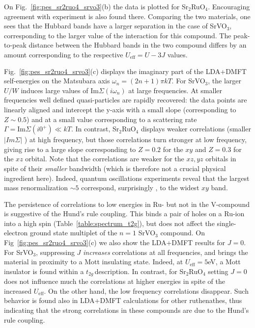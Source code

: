 \documentclass[]{ar2e-changed}%
\def\ttg{$t_{2g}\,$}
\begin{document}
On Fig.~\ref{fig:pes_sr2ruo4_srvo3}(b) the data is plotted for
Sr$_2$RuO$_4$. Encouraging agreement with experiment is also found there. 
Comparing the two materials, one sees that the Hubbard bands
have a larger separation in the case of SrVO$_3$, corresponding to the
larger value of the interaction for this compound. 
The peak-to-peak distance between the Hubbard bands in the two
compound differs by an amount corresponding to the respective
$U_\mathrm{eff}=U-3J$ values.

Fig.~\ref{fig:pes_sr2ruo4_srvo3}(c) displays the imaginary part of the LDA+DMFT 
self-energies on the Matsubara axis $\omega_n=(2n+1)\pi kT$.  
%
For SrVO$_3$, the larger $U/W$ induces large values
of $\mathrm{Im}\Sigma(i\omega_n)$ at large frequencies. At smaller frequencies well
defined quasi-particles are rapidly recovered: the data points  
are linearly aligned and intercept the y-axis with a small slope
(corresponding to $Z\sim 0.5$) and at a small value corresponding to a scattering rate  
$\Gamma=\mathrm{Im}\Sigma(i0^+) \ll kT$. 
%
In contrast, Sr$_2$RuO$_4$ displays weaker correlations (smaller $|Im \Sigma|$ %
) 
at high frequency, but those correlations turn stronger at  low frequency, 
giving rise to a large slope corresponding to $Z=0.2$ for the $xy$ and $Z=0.3$ for the
$xz$ orbital. 
%
Note that the correlations are weaker for the $xz,yz$ orbitals in spite of their {\it smaller} bandwidth 
(which is therefore not a crucial physical ingredient here). 
Indeed, quantum oscillations experiments reveal that the largest mass renormalization 
$\sim 5$ correspond, surprisingly \cite{konik_prb_2007}, to the widest $xy$ band. 

The persistence of correlations to low energies in Ru- but not in the 
V-compound is suggestive of the Hund's rule coupling. This binds a
pair of holes on a Ru-ion into a high spin (Table~\ref{table:spectrum_t2g}), 
but does not affect the single-electron ground state multiplet of the $n=1$ SrVO$_3$ compound. 
%
On Fig~\ref{fig:pes_sr2ruo4_srvo3}(c) we also show the LDA+DMFT 
results for $J=0$. 
%
For SrVO$_3$, suppressing $J$ {\it increases} correlations at all frequencies, and brings 
the material in proximity to a Mott insulating state. Indeed, at $U_\mathrm{eff}=5$eV,
a Mott insulator is found within a \ttg description.  
%
In contrast, for Sr$_2$RuO$_4$ setting $J=0$ does not influence much 
the correlations at higher energies in spite of the increased $U_\mathrm{eff}$. 
On the other hand, the low frequency correlations disappear.
%
Such behavior is found also in LDA+DMFT calculations for other ruthenathes, thus indicating that 
the strong correlations in these compounds are due to the Hund's rule coupling.
\end{document}
